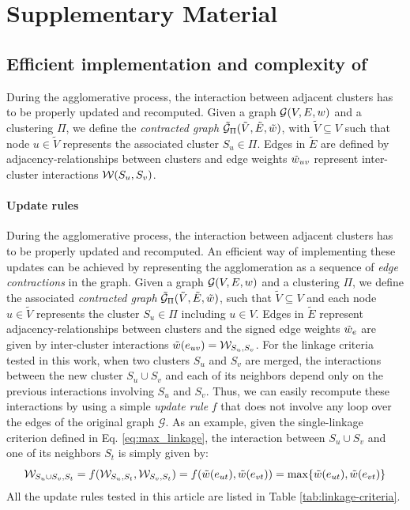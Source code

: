 \section{Supplementary Material}

\subsection{Efficient implementation and complexity of \algname{}}


During the agglomerative process, the interaction between adjacent clusters has to be properly updated and recomputed.  %
Given a graph $\mathcal{G}(V,E,w)$ and a clustering $\Pi$, we define the \emph{contracted graph} $\tilde{\mathcal{G}}_\Pi(\tilde{V}, \tilde{E}, \tilde{w})$, with $\tilde{V} \subseteq V$ such that node $u\in \tilde{V}$ represents the associated cluster $S_u \in \Pi$. Edges in $\tilde{E}$ are defined by adjacency-relationships between clusters and edge weights $\tilde{w}_{uv}$ represent inter-cluster interactions $\mathcal{W}(S_u,S_v)$. 

\paragraph{Update rules} During the agglomerative process, the interaction between adjacent clusters has to be properly updated and recomputed.  %
An efficient way of implementing these updates can be achieved by representing the agglomeration as a sequence of \emph{edge contractions} in the graph. Given a graph $\mathcal{G}(V,E,w)$ and a clustering $\Pi$, we define the associated \emph{contracted graph} $\tilde{\mathcal{G}}_\Pi(\tilde{V}, \tilde{E}, \tilde{w})$, such that $\tilde{V} \subseteq V$ and each node $u\in \tilde{V}$ represents the cluster $S_u \in \Pi$ including $u\in V$. Edges in $\tilde{E}$ represent adjacency-relationships between clusters and the signed edge weights $\tilde{w}_e$ are given by inter-cluster interactions $\tilde{w}(e_{uv})=\mathcal{W}_{S_u,S_v}$. 
For the linkage criteria tested in this work, when two clusters $S_u$ and $S_v$ are merged, the interactions between the new cluster $S_u \cup S_v$ and each of its neighbors depend only on the previous interactions involving $S_u$ and $S_v$. Thus, we can easily recompute these interactions by using a simple \emph{update rule} $f$ that does not involve any loop over the edges of the original graph $\mathcal{G}$. As an example, given the single-linkage criterion defined in Eq. \ref{eq:max_linkage}, the interaction between $S_u \cup S_v$ and one of its neighbors $S_t$ is simply given by:
\begin{equation}
  \mathcal{W}_{S_u \cup S_v,S_t} = f( \mathcal{W}_{S_u,S_t}, \mathcal{W}_{S_v,S_t}) = f(\tilde{w}(e_{ut}), \tilde{w}(e_{vt})) = \max \{ \tilde{w}(e_{ut}), \tilde{w}(e_{vt}) \}
\end{equation}
All the update rules tested in this article are listed in Table \ref{tab:linkage-criteria}.

